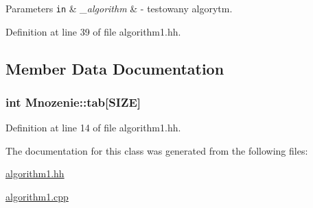 \begin{DoxyParams}[1]{Parameters}
\mbox{\tt in}  & {\em \+\_\+algorithm} & -\/ testowany algorytm. \\
\hline
\end{DoxyParams}


Definition at line 39 of file algorithm1.\+hh.



\subsection{Member Data Documentation}
\hypertarget{class_mnozenie_a6dc67671f84a557d97c322b8af528359}{}
\subsubsection[{tab}]{\setlength{\rightskip}{0pt plus 5cm}int Mnozenie\+::tab\mbox{[}{\bf S\+I\+Z\+E}\mbox{]}\hspace{0.3cm}{\ttfamily [private]}}\label{class_mnozenie_a6dc67671f84a557d97c322b8af528359}


Definition at line 14 of file algorithm1.\+hh.



The documentation for this class was generated from the following files\+:\begin{DoxyCompactItemize}
\item 
\hyperlink{algorithm1_8hh}{algorithm1.\+hh}\item 
\hyperlink{algorithm1_8cpp}{algorithm1.\+cpp}\end{DoxyCompactItemize}
